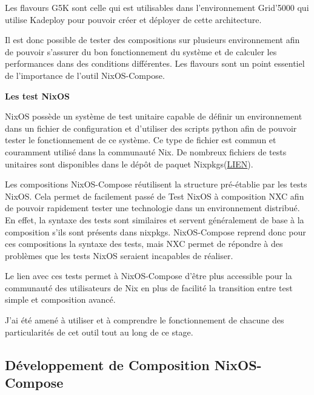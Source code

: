 \documentclass[a4paper,french,12pt, titlepage]{article}
\begin{document}
Les flavours G5K sont celle qui est utilisables dans l'environnement
Grid'5000 qui utilise Kadeploy \cite{kadeploy2011} pour pouvoir créer et
déployer de cette architecture.\newline

Il est donc possible de tester des compositions sur plusieurs
environnement afin de pouvoir s'assurer du bon fonctionnement du système
et de calculer les performances dans des conditions différentes. Les
flavours sont un point essentiel de l'importance de l'outil
NixOS-Compose.\newline

\textbf{Les test NixOS}\newline

NixOS possède un système de test unitaire capable de définir un
environnement dans un fichier de configuration et d'utiliser des scripts
python afin de pouvoir tester le fonctionnement de ce système. Ce type
de fichier est commun et couramment utilisé dans la communauté Nix. De
nombreux fichiers de tests unitaires sont disponibles dans le dépôt de
paquet
Nixpkgs(\href{https://github.com/NixOS/nixpkgs/tree/master/nixos/tests}{LIEN}).\newline

Les compositions NixOS-Compose réutilisent la structure pré-établie par
les tests NixOS. Cela permet de facilement passé de Test NixOS à
composition NXC afin de pouvoir rapidement tester une technologie dans
un environnement distribué. En effet, la syntaxe des tests sont
similaires et servent généralement de base à la composition s'ils sont
présents dans nixpkgs. NixOS-Compose reprend donc pour ces compositions
la syntaxe des tests, mais NXC permet de répondre à des problèmes que
les tests NixOS seraient incapables de réaliser.\newline

Le lien avec ces tests permet à NixOS-Compose d'être plus accessible
pour la communauté des utilisateurs de Nix en plus de facilité la
transition entre test simple et composition avancé.\newline

J'ai été amené à utiliser et à comprendre le fonctionnement de chacune
des particularités de cet outil tout au long de ce stage.\newline

\newpage

\hypertarget{duxe9veloppement-de-composition-nixos-compose}{%
\subsection{Développement de Composition
NixOS-Compose}\label{duxe9veloppement-de-composition-nixos-compose}}
\end{document}
